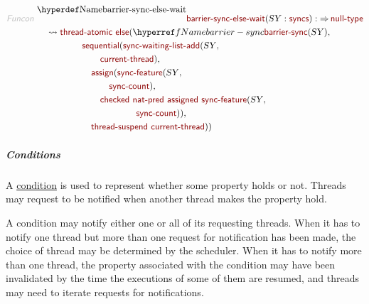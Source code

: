 \begin{align*}
  \KEY{Funcon} ~ 
  & \NAMEDECL{barrier-sync-else-wait}(\VAR{SY} : \NAME{syncs}) :  \TO \NAME{null-type} \\
  & \quad \leadsto \NAME{thread-atomic} ~
                     \NAME{else}
                       ( \NAMEREF{barrier-sync}
                           ( \VAR{SY} ), \\&\quad \quad \quad \quad \quad 
                         \NAME{sequential}
                           ( \NAME{sync-waiting-list-add}
                               ( \VAR{SY}, \\&\quad \quad \quad \quad \quad \quad \quad 
                                 \NAME{current-thread} ), \\&\quad \quad \quad \quad \quad \quad 
                             \NAME{assign}
                               ( \NAME{sync-feature}
                                   ( \VAR{SY}, \\&\quad \quad \quad \quad \quad \quad \quad \quad 
                                     \NAME{sync-count} ), \\&\quad \quad \quad \quad \quad \quad \quad 
                                 \NAME{checked} ~
                                   \NAME{nat-pred} ~
                                     \NAME{assigned} ~
                                       \NAME{sync-feature}
                                         ( \VAR{SY}, \\&\quad \quad \quad \quad \quad \quad \quad \quad \quad \quad \quad 
                                           \NAME{sync-count} ) ), \\&\quad \quad \quad \quad \quad \quad 
                             \NAME{thread-suspend} ~
                               \NAME{current-thread} ) )
\end{align*}
\subparagraph*{Conditions}\hypertarget{conditions}{}\label{conditions}

A \href{http://pages.cs.wisc.edu/~remzi/OSTEP/threads-cv.pdf}{condition} is used to represent whether some property holds or not.
Threads may request to be notified when another thread makes the property hold.

A condition may notify either one or all of its requesting threads. When it has
to notify one thread but more than one request for notification has been made,
the choice of thread may be determined by the scheduler. When it has to notify
more than one thread, the property associated with the condition may have been
invalidated by the time the executions of some of them are resumed, and threads
may need to iterate requests for notifications.

